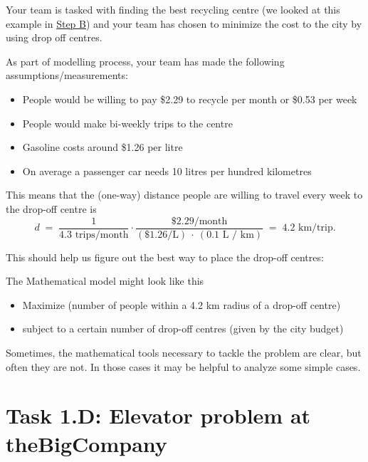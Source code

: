 \begin{example}
Your team is tasked with finding the best recycling centre (we looked at this example in \hyperref[mindmap]{Step B}) and your  team has chosen to minimize the cost to the city by using drop off centres.

As part of modelling process, your team has made the following assumptions/measurements:
\begin{itemize}
	\item People would be willing to pay \$2.29 to recycle per month or \$0.53 per week
	\item People would make bi-weekly trips to the centre
	\item Gasoline costs around \$1.26 per litre
	\item On average a passenger car needs 10 litres per hundred kilometres
\end{itemize}

This means that the (one-way) distance people are willing to travel every week to the drop-off centre is
$$
d \;=\; \frac{1}{4.3 \text{ trips/month}} \cdot \frac{\$2.29 / {\text{month}} }{(\$1.26 \text{/L}) \ \cdot\  (0.1 \text{ L / km})} \;=\; 4.2 \text{  km/trip}.
$$

This should help us figure out the best way to place the drop-off centres:

The Mathematical model might look like this

\begin{itemize}
	\item Maximize (number of people within a 4.2 km radius of a drop-off centre)
	\item subject to a certain number of drop-off centres (given by the city budget)
\end{itemize}

	
\end{example}

\hfill

Sometimes, the mathematical tools necessary to tackle the problem are clear, but often they are not. In those cases it may be helpful to analyze some simple cases.









\vfill



\section*{Task 1.D: Elevator problem at theBigCompany}


